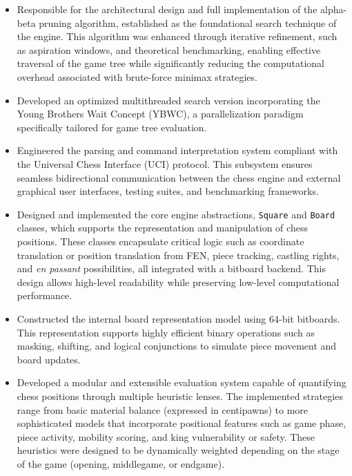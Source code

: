 \begin{itemize}[itemsep=1pt]
    \item Responsible for the architectural design and full implementation of the alpha-beta pruning algorithm, established as the foundational search technique of the engine. This algorithm was enhanced through iterative refinement, such as aspiration windows, and theoretical benchmarking, enabling effective traversal of the game tree while significantly reducing the computational overhead associated with brute-force minimax strategies.

    \item Developed an optimized multithreaded search version incorporating the Young Brothers Wait Concept (YBWC), a parallelization paradigm specifically tailored for game tree evaluation.

    \item Engineered the parsing and command interpretation system compliant with the Universal Chess Interface (UCI) protocol. This subsystem ensures seamless bidirectional communication between the chess engine and external graphical user interfaces, testing suites, and benchmarking frameworks.

    \item Designed and implemented the core engine abstractions, \texttt{Square} and \texttt{Board} classes, which supports the representation and manipulation of chess positions. These classes encapsulate critical logic such as coordinate translation or position translation from FEN, piece tracking, castling rights, and \textit{en passant} possibilities, all integrated with a bitboard backend. This design allows high-level readability while preserving low-level computational performance.

    \item Constructed the internal board representation model using 64-bit bitboards. This representation supports highly efficient binary operations such as masking, shifting, and logical conjunctions to simulate piece movement and board updates.

    \item Developed a modular and extensible evaluation system capable of quantifying chess positions through multiple heuristic lenses. The implemented strategies range from basic material balance (expressed in centipawns) to more sophisticated models that incorporate positional features such as game phase, piece activity, mobility scoring, and king vulnerability or safety. These heuristics were designed to be dynamically weighted depending on the stage of the game (opening, middlegame, or endgame).


\end{itemize}
